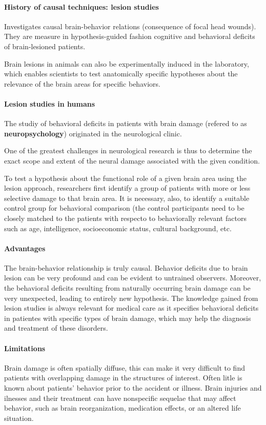 \documentclass[12pt,article,oneside,a4paper]{memoir}
\begin{document}
\paragraph{History of causal techniques: lesion studies } Investigates causal brain-behavior relations (consequence of focal head wounds). They are measure in hypothesis-guided fashion cognitive and behavioral deficits of brain-lesioned patients.

Brain lesions in animals can also be experimentally induced in the laboratory, which enables scientists to test anatomically specific hypotheses about the relevance of the brain areas for specific behaviors.

\paragraph{Lesion studies in humans} The studiy of behavioral deficits in patients with brain damage (refered to as \textbf{neuropsychology}) originated in the neurological clinic.

One of the greatest challenges in neurological research is thus to determine the exact scope and extent of the neural damage associated with the given condition.

To test a hypothesis about the functional role of a given brain area using the lesion approach, researchers first identify a group of patients with more or less selective damage to that brain area. It is necessary, also, to identify a suitable control group for behavioral comparison (the control participants need to be closely matched to the patients with respecto to behaviorally relevant factors such as age, intelligence, socioeconomic status, cultural background, etc.

\paragraph{Advantages} The brain-behavior relationship is truly causal. Behavior deficits due to brain lesion can be very profound and can be evident to untrained observers. Moreover, the behavioral deficits resulting from naturally occurring brain damage can be very unexpected, leading to entirely new hypothesis. The knowledge gained from lesion studies is always relevant for medical care as it specifies behavioral deficits in patientes with specific types of brain damage, which may help the diagnosis and treatment of these disorders.

\paragraph{Limitations} Brain damage is often spatially diffuse, this can make it very difficult to find patients with overlapping damage in the structures of interest. Often litle is known about patients' behavior prior to the accident or illness. Brain injuries and ilnesses and their treatment can have nonspecific sequelae that may affect behavior, such as brain reorganization, medication effects, or an altered life situation.
\end{document}
